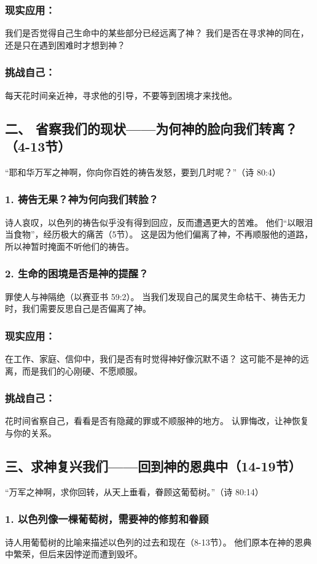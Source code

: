 \documentclass[a4paper, 12pt]{article}
\begin{document}
\subsubsection*{现实应用：}
我们是否觉得自己生命中的某些部分已经远离了神？
我们是否在寻求神的同在，还是只在遇到困难时才想到神？
\subsubsection*{挑战自己：}

每天花时间亲近神，寻求他的引导，不要等到困境才来找他。
\subsection*{二、 省察我们的现状——为何神的脸向我们转离？（4-13节）}
“耶和华万军之神啊，你向你百姓的祷告发怒，要到几时呢？”（诗 80:4）

\subsubsection*{1. 祷告无果？神为何向我们转脸？}
诗人哀叹，以色列的祷告似乎没有得到回应，反而遭遇更大的苦难。
他们“以眼泪当食物”，经历极大的痛苦（5节）。
这是因为他们偏离了神，不再顺服他的道路，所以神暂时掩面不听他们的祷告。
\subsubsection*{2. 生命的困境是否是神的提醒？}
罪使人与神隔绝（以赛亚书 59:2）。
当我们发现自己的属灵生命枯干、祷告无力时，我们需要反思自己是否偏离了神。
\subsubsection*{现实应用：}
在工作、家庭、信仰中，我们是否有时觉得神好像沉默不语？
这可能不是神的远离，而是我们的心刚硬、不愿顺服。
\subsubsection*{挑战自己：}

花时间省察自己，看看是否有隐藏的罪或不顺服神的地方。
认罪悔改，让神恢复与你的关系。
\subsection*{三、求神复兴我们——回到神的恩典中（14-19节）}
“万军之神啊，求你回转，从天上垂看，眷顾这葡萄树。”（诗 80:14）

\subsubsection*{1. 以色列像一棵葡萄树，需要神的修剪和眷顾}
诗人用葡萄树的比喻来描述以色列的过去和现在（8-13节）。
他们原本在神的恩典中繁荣，但后来因悖逆而遭到毁坏。
\end{document}
